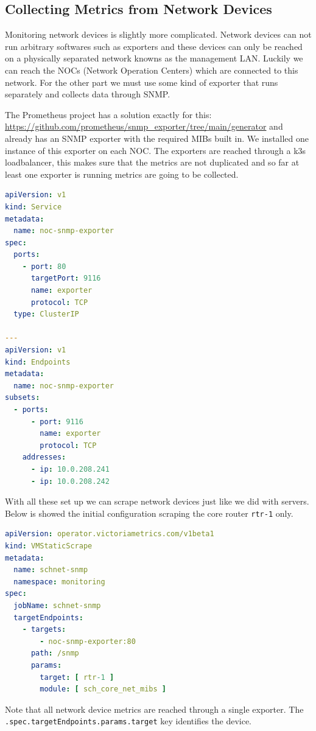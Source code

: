 \subsection{Collecting Metrics from Network Devices}

Monitoring network devices is slightly more complicated.  Network devices can
not run arbitrary softwares such as exporters and these devices can only be
reached on a physically separated network knowns as the management LAN. Luckily
we can reach the NOCs (Network Operation Centers) which are connected to this
network. For the other part we must use some kind of exporter that runs
separately and collects data through SNMP.

The Prometheus project has a solution exactly for this:
\url{https://github.com/prometheus/snmp_exporter/tree/main/generator} and \kszk
already has an SNMP exporter with the required MIBs built in. We installed one
instance of this exporter on each NOC. The exporters are reached through a k3s
loadbalancer, this makes sure that the metrics are not duplicated and so far at
least one exporter is running metrics are going to be collected.

\begin{lstlisting}[language=yaml,caption=Load balancer configuration]
apiVersion: v1
kind: Service
metadata:
  name: noc-snmp-exporter
spec:
  ports:
    - port: 80
      targetPort: 9116
      name: exporter
      protocol: TCP
  type: ClusterIP

---
apiVersion: v1
kind: Endpoints
metadata:
  name: noc-snmp-exporter
subsets:
  - ports:
      - port: 9116
        name: exporter
        protocol: TCP
    addresses:
      - ip: 10.0.208.241
      - ip: 10.0.208.242
\end{lstlisting}

With all these set up we can scrape network devices just like we did with
servers. Below is showed the initial configuration scraping the core router
\verb+rtr-1+ only.

\begin{lstlisting}[language=yaml,caption=Initial SNMP scraping configuration]
apiVersion: operator.victoriametrics.com/v1beta1
kind: VMStaticScrape
metadata:
  name: schnet-snmp
  namespace: monitoring
spec:
  jobName: schnet-snmp
  targetEndpoints:
    - targets:
        - noc-snmp-exporter:80
      path: /snmp
      params:
        target: [ rtr-1 ]
        module: [ sch_core_net_mibs ]
\end{lstlisting}

Note that all network device metrics are reached through a single exporter. The
\verb+.spec.targetEndpoints.params.target+ key identifies the device.

